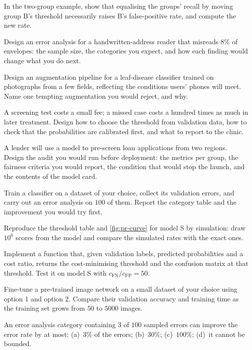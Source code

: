 \ap In the two-group example, show that equalising the groups' recall by moving
group B's threshold necessarily raises B's false-positive rate, and compute the
new rate.


\dpr Design an error analysis for a handwritten-address reader that misreads
$8\%$ of envelopes: the sample size, the categories you expect, and how each
finding would change what you do next.

\dpr Design an augmentation pipeline for a leaf-disease classifier trained on
photographs from a few fields, reflecting the conditions users' phones will
meet. Name one tempting augmentation you would reject, and why.

\dpr A screening test costs a small fee; a missed case costs a hundred times as
much in later treatment. Design how to choose the threshold from validation
data, how to check that the probabilities are calibrated first, and what to
report to the clinic.

\dpr A lender will use a model to pre-screen loan applications from two regions.
Design the audit you would run before deployment: the metrics per group, the
fairness criteria you would report, the condition that would stop the launch,
and the contents of the model card.


\pe Train a classifier on a dataset of your choice, collect its validation
errors, and carry out an error analysis on $100$ of them. Report the category
table and the improvement you would try first.

\pe Reproduce the threshold table and \cref{fig:pr-curve} for model S by
simulation: draw $10^6$ scores from the model and compare the simulated rates with
the exact ones.

\pe Implement a function that, given validation labels, predicted probabilities
and a cost ratio, returns the cost-minimising threshold and the confusion matrix
at that threshold. Test it on model S with $c_{\text{FN}}/c_{\text{FP}} = 50$.

\pe Fine-tune a pre-trained image network on a small dataset of your choice using
option 1 and option 2. Compare their validation accuracy and training time as
the training set grows from $50$ to $5000$ images.


\qz An error analysis category containing $3$ of $100$ sampled errors can
improve the error rate by at most: (a)~$3\%$ of the errors; (b)~$30\%$;
(c)~$100\%$; (d)~it cannot be bounded.

